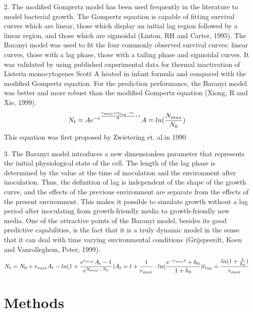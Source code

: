\documentclass[11pt]{article}
\begin{document}
2.	The modified Gompertz model has been used frequently in the literature to model bacterial growth. The Gompertz equation is capable of fitting survival curves which are linear, those which display an initial lag region followed by a linear region, and those which are sigmoidal (Linton, RH and Carter, 1995). The Baranyi model was used to fit the four commonly observed survival curves: linear curves, those with a lag phase, those with a tailing phase and sigmoidal curves. It was validated by using published experimental data for thermal inactivation of Listeria monocytogenes Scott A heated in infant formula and compared with the modified Gompertz equation. For the prediction performance, the Baranyi model was better and more robust than the modified Gompertz equation (Xiong, R and Xie, 1999).
  \begin{equation}
    N_t = Ae^{-e^{\frac{r_{max}e(t_{lag}-t)}{A}+1}}\\
    A=ln(\frac{N_{max}}{N_0})
  \end{equation}
  This equation was first proposed by Zwietering et. al.in 1990

3.	The Baranyi model introduces a new dimensionless parameter that represents the initial physiological state of the cell. The length of the lag phase is determined by the value at the time of inoculation and the environment after inoculation. Thus, the definition of lag is independent of the shape of the growth curve, and the effects of the previous environment are separate from the effects of the present environment. This makes it possible to simulate growth without a lag period after inoculating from growth-friendly media to growth-friendly new media. One of the attractive points of the Baranyi model, besides its good predictive capabilities, is the fact that it is a truly dynamic model in the sense that it can deal with time varying environmental conditions (Grijspeerdt, Koen and Vanrolleghem, Peter, 1999).
  \begin{equation}
    N_t = N_0 + r_{max}A_t - ln(1+\frac{e^{r_{max}}A_t-1}{e^{N_{max}-N_0}})\\
    A_t = t + \frac{1}{r_{max}}\cdot ln(\frac{e^{-r_{max}t}+h_0}{1+h_0})\\
    t_{lag} = \frac{ln(1+\frac{1}{h_0})}{r_{max}}
  \end{equation}

  \section{Methods}
\end{document}
